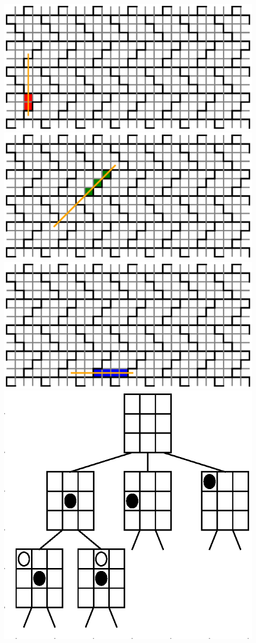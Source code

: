 \documentclass{article}
\begin{document}
\\
\includegraphics{8-sol-straight.eps}
\\
\includegraphics{8-sol-diagonal.eps}
\\
\includegraphics{8-sol-horizontal.eps}
\\
\includegraphics{arbre.eps}
\end{document}
